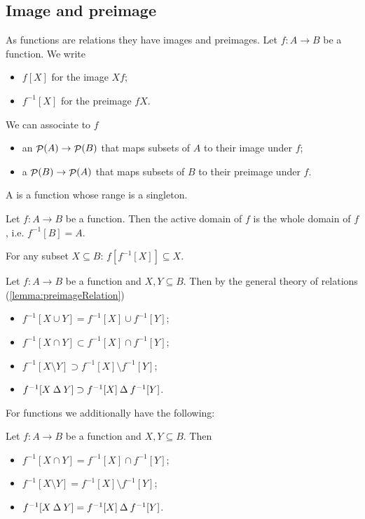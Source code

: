 \subsection{Image and preimage}
As functions are relations they have images and preimages. Let $f:A\to B$ be a function. We write
\begin{itemize}
\item $f[X]$ for the image $Xf$;
\item $f^{-1}[X]$ for the preimage $fX$.
\end{itemize}
We can associate to $f$
\begin{itemize}
\item an  $\mathop{\mathcal{P}}(A) \to \mathop{\mathcal{P}}(B)$ that maps subsets of $A$ to their image under $f$;
\item a  $\mathop{\mathcal{P}}(B) \to \mathop{\mathcal{P}}(A)$ that maps subsets of $B$ to their preimage under $f$.
\end{itemize}

A  is a function whose range is a singleton.

\begin{lemma}
Let $f:A\to B$ be a function. Then the active domain of $f$ is the whole domain of $f$, i.e. $f^{-1}[B] = A$.
\end{lemma}
For any subset $X\subseteq B$: $f[f^{-1}[X]]\subseteq X$.

Let $f:A\to B$ be a function and $X,Y\subseteq B$. Then by the general theory of relations (\ref{lemma:preimageRelation})
\begin{itemize}
\item $f^{-1}[X\cup Y] = f^{-1}[X]\cup f^{-1}[Y]$;
\item $f^{-1}[X\cap Y] \subset f^{-1}[X]\cap f^{-1}[Y]$;
\item $f^{-1}[X\setminus Y] \supset f^{-1}[X]\setminus f^{-1}[Y]$;
\item $f^{-1}[X\mathbin{\Delta} Y] \supset f^{-1}[X]\mathbin{\Delta} f^{-1}[Y]$.
\end{itemize}
For functions we additionally have the following:
\begin{lemma} \label{lemma:preimageProperties}
Let $f:A\to B$ be a function and $X,Y\subseteq B$. Then
\begin{itemize}
\item $f^{-1}[X\cap Y] = f^{-1}[X]\cap f^{-1}[Y]$;
\item $f^{-1}[X\setminus Y] = f^{-1}[X]\setminus f^{-1}[Y]$;
\item $f^{-1}[X\mathbin{\Delta} Y] = f^{-1}[X]\mathbin{\Delta} f^{-1}[Y]$.
\end{itemize}
\end{lemma}

